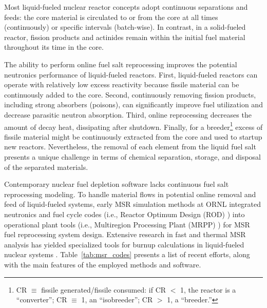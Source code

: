 Most liquid-fueled nuclear reactor concepts adopt continuous separations 
and feeds: the core material is circulated to or from the core at all times 
(continuously) or specific intervals (batch-wise). In contrast, in a 
solid-fueled reactor, fission products and actinides remain within the initial 
fuel material throughout its time in the core.

The ability to perform online fuel salt reprocessing improves the potential 
neutronics performance of liquid-fueled reactors. First, liquid-fueled 
reactors can operate with relatively low excess reactivity because fissile 
material can be continuously added to the core. Second, continuously removing 
fission products, including strong absorbers (poisons), can significantly 
improve fuel utilization and decrease parasitic neutron absorption. Third, 
online reprocessing decreases the amount of decay heat, dissipating after 
shutdown. Finally, for a breeder\footnote{\gls{CR} 
	$\equiv$ fissile generated/fissile consumed: if CR $<$ 1, the reactor is a 
	``converter''; CR $\equiv$ 1, an ``isobreeder''; CR $>$ 1, a 
	``breeder.''} excess of fissile material might be continuously extracted  
from the core and used to startup new reactors. Nevertheless, the removal of
each element from the liquid fuel salt presents a unique challenge in terms of
chemical separation, storage, and disposal of the separated materials.

Contemporary nuclear fuel depletion software lacks continuous fuel salt 
reprocessing modeling. To handle material flows in potential online removal 
and feed of liquid-fueled systems, early \gls{MSR} simulation methods at 
\gls{ORNL} integrated neutronics and fuel cycle codes (i.e., Reactor Optimum 
Design (ROD) \cite{bauman_rod_1971}) into operational plant tools (i.e., 
Multiregion Processing Plant (MRPP) \cite{kee_mrpp_1976}) for \gls{MSR} fuel 
reprocessing system design. Extensive research in fast and thermal MSR 
analysis has yielded specialized tools for burnup calculations in 
liquid-fueled nuclear systems \cite{fiorina_investigation_2013, 
sheu_depletion_2013, aufiero_extended_2013, heuer_towards_2014, 
park_whole_2015, betzler_molten_2017, betzler_molten_2019}. 
Table~\ref{tab:msr_codes} presents a list of recent efforts, along with the 
main features of the employed methods and software.
\FloatBarrier

